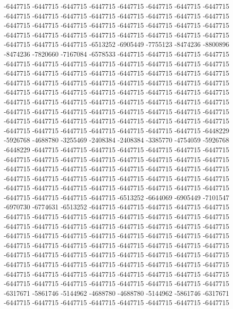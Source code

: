 -6447715 -6447715 -6447715 -6447715 -6447715 -6447715 -6447715 -6447715 -6447715 -6447715 -6447715 -6447715 -6447715 -6447715 -6447715 -6447715 -6447715 -6447715 -6447715 -6447715 -6447715 -6447715 -6447715 -6447715 -6447715 -6447715 -6447715 -6447715 -6447715 -6447715 -6447715 -6447715 -6447715 -6447715 -6447715 -6513252 -6905449 -7755123 -8474236 -8800896 -8474236 -7820660 -7167084 -6578533 -6447715 -6447715 -6447715 -6447715 -6447715 -6447715 -6447715 -6447715 -6447715 -6447715 -6447715 -6447715 -6447715 -6447715 -6447715 -6447715 -6447715 -6447715 -6447715 -6447715 -6447715 -6447715 -6447715 -6447715 -6447715 -6447715 -6447715 -6447715 -6447715 -6447715 -6447715 -6447715 -6447715 -6447715 -6447715 -6447715 -6447715 -6447715 -6447715 -6447715 -6447715 -6447715 -6447715 -6447715 -6447715 -6447715 -6447715 -6447715 -6447715 -6447715 -6447715 -6447715 -6447715 -6447715 -6447715 -6447715 -6447715 -6447715 -6447715 -6447715 -6447715 -6447715 -6447715 -6447715 -6447715 -6447715 -6447715 -6448229 -5926768 -4688780 -3255469 -2408384 -2408384 -3385770 -4754059 -5926768 -6448229 -6447715 -6447715 -6447715 -6447715 -6447715 -6447715 -6447715
-6447715 -6447715 -6447715 -6447715 -6447715 -6447715 -6447715 -6447715 -6447715 -6447715 -6447715 -6447715 -6447715 -6447715 -6447715 -6447715 -6447715 -6447715 -6447715 -6447715 -6447715 -6447715 -6447715 -6447715 -6447715 -6447715 -6447715 -6447715 -6447715 -6447715 -6447715 -6447715 -6447715 -6447715 -6447715 -6447715 -6513252 -6644069 -6905449 -7101547 -6970730 -6774631 -6513252 -6447715 -6447715 -6447715 -6447715 -6447715 -6447715 -6447715 -6447715 -6447715 -6447715 -6447715 -6447715 -6447715 -6447715 -6447715 -6447715 -6447715 -6447715 -6447715 -6447715 -6447715 -6447715 -6447715 -6447715 -6447715 -6447715 -6447715 -6447715 -6447715 -6447715 -6447715 -6447715 -6447715 -6447715 -6447715 -6447715 -6447715 -6447715 -6447715 -6447715 -6447715 -6447715 -6447715 -6447715 -6447715 -6447715 -6447715 -6447715 -6447715 -6447715 -6447715 -6447715 -6447715 -6447715 -6447715 -6447715 -6447715 -6447715 -6447715 -6447715 -6447715 -6447715 -6447715 -6447715 -6447715 -6447715 -6447715 -6447715 -6447715 -6317671 -5861746 -5144962 -4688780 -4688780 -5144962 -5861746 -6317671 -6447715 -6447715 -6447715 -6447715 -6447715 -6447715 -6447715 -6447715
